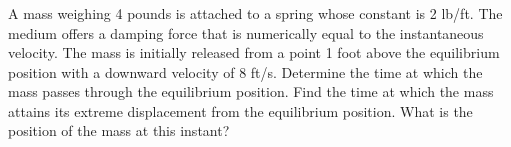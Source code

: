 \documentclass{article}
\begin{document}
 
\pagestyle{fancy}

\setcounter{section}{5}
\setcounter{subsection}{1}
\setcounter{subsubsection}{2}
\subsubsection{}
A mass weighing 4 pounds is attached to a spring whose constant is 2 lb/ft. The medium offers a damping force that is numerically equal to the instantaneous velocity. The mass is initially released from a point 1 foot above the equilibrium position with a downward velocity of 8 ft/s. Determine the time at which the mass passes through the equilibrium position. Find the time at which the mass attains its extreme displacement from the equilibrium position. What is the position of the mass at this instant?
\end{document}
